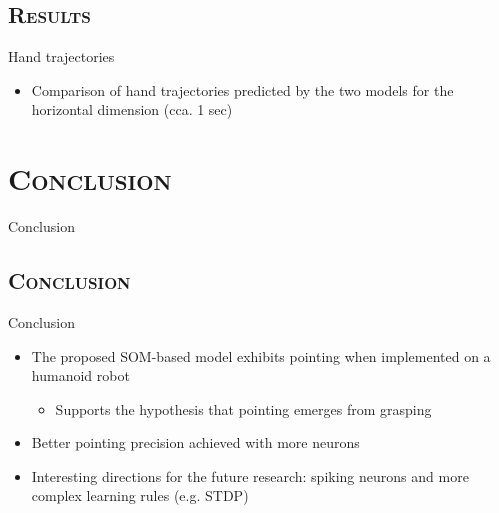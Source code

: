 \documentclass[xcolor=x11names,dvipsnames,compress]{beamer}
\renewcommand{\(}{\begin{columns}}
\renewcommand{\)}{\end{columns}}
\newcommand{\<}[1]{\begin{column}{#1}}
\renewcommand{\>}{\end{column}}
\begin{document}
\subsection{\scshape Results}
\begin{frame}{Hand trajectories}
\begin{itemize}
      \item Comparison of hand trajectories predicted by the two models for the horizontal dimension (cca. 1 sec)
      \begin{figure}[ht]     
      \end{figure}

\end{itemize}
\end{frame}

\section{\scshape Conclusion}
\begin{frame}[noframenumbering]
\Large Conclusion
\end{frame}


\subsection{\scshape Conclusion}
\begin{frame}{Conclusion}

\begin{itemize}	
	\item The proposed SOM-based model exhibits pointing when implemented on a humanoid robot
	  \begin{itemize}
	   \item Supports the hypothesis that pointing emerges from grasping \cite{Kaplan2006}
	  \end{itemize}
	\item Better pointing precision achieved with more neurons
	\item Interesting directions for the future research: spiking neurons and more complex learning rules (e.g. STDP)
\end{itemize}
\end{frame}

\end{document}
